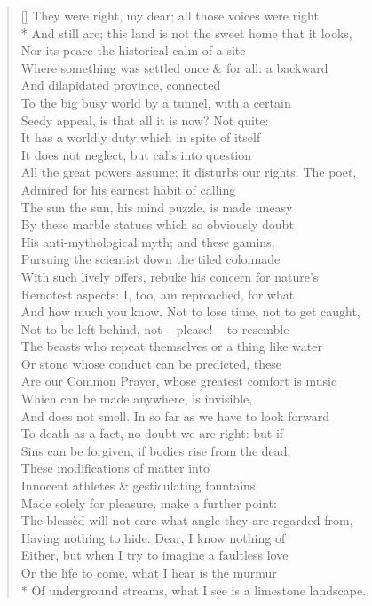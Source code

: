 \documentclass[MAIN]{subfiles}
\begin{document}
\begin{verse}[\versewidth]
\vin They were right, my dear; all those voices were right\\*
And still are; this land is not the sweet home that it looks,\\
\vin Nor its peace the historical calm of a site\\
Where something was settled once \& for all: a backward\\
\vin And dilapidated province, connected\\
To the big busy world by a tunnel, with a certain\\
\vin Seedy appeal, is that all it is now? Not quite:\\
It has a worldly duty which in spite of itself\\
\vin It does not neglect, but calls into question\\
All the great powers assume; it disturbs our rights. The poet,\\
\vin Admired for his earnest habit of calling\\
The sun the sun, his mind puzzle, is made uneasy\\
\vin By these marble statues which so obviously doubt\\
His anti-mythological myth; and these gamins,\\
\vin Pursuing the scientist down the tiled colonnade\\
With such lively offers, rebuke his concern for nature's\\
\vin Remotest aspects: I, too, am reproached, for what\\
And how much you know. Not to lose time, not to get caught,\\
\vin Not to be left behind, not -- please! -- to resemble\\
The beasts who repeat themselves or a thing like water\\
\vin Or stone whose conduct can be predicted, these\\
Are our {\hge Common Prayer}, whose greatest comfort is music\\
\vin Which can be made anywhere, is invisible,\\
And does not smell. In so far as we have to look forward\\
\vin To death as a fact, no doubt we are right: but if\\
Sins can be forgiven, if bodies rise from the dead,\\
\vin These modifications of matter into\\
Innocent athletes \& gesticulating fountains,\\
\vin Made solely for pleasure, make a further point:\\
The bless\`ed will not care what angle they are regarded from,\\
\vin Having nothing to hide. Dear, I know nothing of\\
Either, but when I try to imagine a faultless love\\
\vin Or the life to come, what I hear is the murmur\\*
Of underground streams, what I see is a limestone landscape.
\end{verse}
\end{document}
